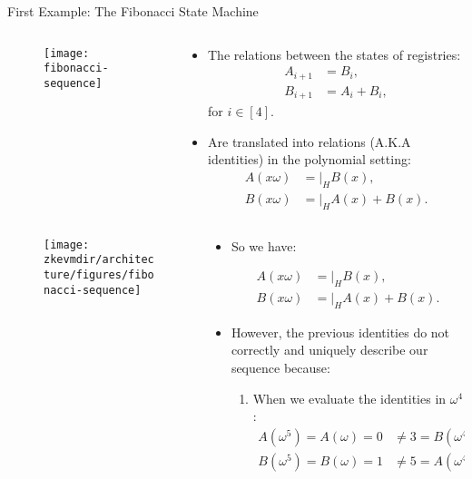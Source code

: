 \begin{frame}[allowframebreaks]{First Example: The Fibonacci State Machine}
\begin{columns}
\begin{column}{0.3\textwidth}
\begin{figure}
	\texttt{[image: fibonacci-sequence]}
\end{figure}
\end{column}
\begin{column}{0.7\textwidth}
\begin{itemize}
\item The relations between the states of registries:
\begin{align*}
A_{i+1} &= B_i, \\
B_{i+1} &= A_i + B_i,
\end{align*}
for $i \in [4]$.
\item Are translated into relations (A.K.A identities) in the polynomial setting:
\begin{align*}
A(x\omega) &= \bigg\lvert_H  B(x), \\
B(x\omega) &= \bigg\lvert_H  A(x) + B(x).
\end{align*}
\end{itemize}
\end{column}
\end{columns}


\begin{columns}
\begin{column}{0.3\textwidth}
\begin{figure}
	\texttt{[image: \\zkevmdir/architecture/figures/fibonacci-sequence]}
\end{figure}
\end{column}
\begin{column}{0.7\textwidth}

\begin{itemize}
\item So we have:

\vspace{-0.8cm}
\begin{align*}
A(x\omega) &= \bigg\lvert_H  B(x), \\
B(x\omega) &= \bigg\lvert_H  A(x) + B(x).
\end{align*}
\item However, the previous identities do not correctly and uniquely describe our sequence because:
\begin{enumerate}
\item When we evaluate the identities in $\omega^4$:
\begin{align*}
A(\omega^5) = A(\omega) = 0 &\neq  3 = B(\omega^4), \\
B(\omega^5) = B(\omega) = 1 &\neq  5 = A(\omega^4) + B(\omega^4).
\end{align*}


\end{enumerate}
\end{itemize}
\end{column}
\end{columns}
\end{frame}
